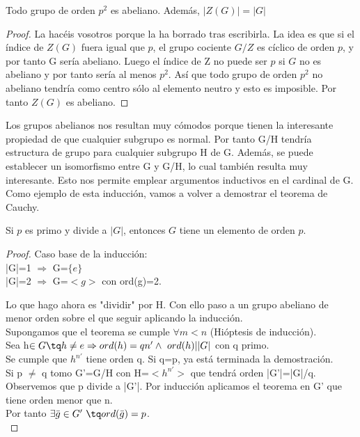 \documentclass[nochap]{apuntes}
\begin{document}
\begin{theorem}
Todo grupo de orden $p^2$ es abeliano. Además, $|Z(G)| = |G|$
\end{theorem}

\begin{proof}
La hacéis vosotros porque \href{http://www.uam.es/personal_pdi/ciencias/villa/imagenes/Foto18.jpg}{\color{blue}{Orlando}} la ha borrado tras escribirla.
La idea es que si el índice de $Z(G)$ fuera igual que $p$, el grupo cociente $G/Z$ es cíclico de orden $p$, y por tanto G sería abeliano. Luego el índice de Z no puede ser $p$ si $G$ no es abeliano y por tanto sería al menos $p^2$. Así que todo grupo de orden $p^2$ no abeliano tendría como centro sólo al elemento neutro y esto es imposible. Por tanto $Z(G)$ es abeliano.
\end{proof}

Los grupos abelianos nos resultan muy cómodos porque tienen la interesante propiedad de que cualquier subgrupo es normal. Por tanto
G/H tendría estructura de grupo para cualquier subgrupo H de G. Además, se puede establecer un isomorfismo entre G y G/H, lo cual también 
resulta muy interesante. Esto nos permite emplear argumentos inductivos en el cardinal de G.\\
Como ejemplo de esta inducción, vamos a volver a demostrar el teorema de Cauchy.
\begin{theorem}
 Si $p$ es primo y divide a $|G|$, entonces $G$ tiene un elemento de orden $p$.
\end{theorem}
\begin{proof}
 Caso base de la inducción:\\
 |G|=1 $\Rightarrow$ G=$\{e\}$ \\
 |G|=2 $\Rightarrow$  G=$<g>$  con ord(g)=2.
 
 Lo que hago ahora es "dividir" por H. Con ello paso a un grupo abeliano de menor orden sobre el que seguir aplicando la inducción.\\
 Supongamos que el teorema se cumple $\forall m < n$  (Hióptesis de inducción).\\
 Sea h$\in G \tq h\neq e\Rightarrow ord(h)=qn' \wedge \ ord(h)| |G|$  con q primo.\\
 Se cumple que $h^{n'}$  tiene orden q. Si q=p, ya está terminada la demostración.\\
 Si p $\neq$ q tomo G'=G/H con H=$<h^{n'}>$  que tendrá orden |G'|=|G|/q.\\
 Observemos que p divide a |G'|. Por inducción aplicamos el teorema en G' que tiene orden menor que n.\\
 Por tanto $\exists \bar{g}\in G' \ \tq ord(\bar{g})=p$.\\
\end{proof}
\end{document}
